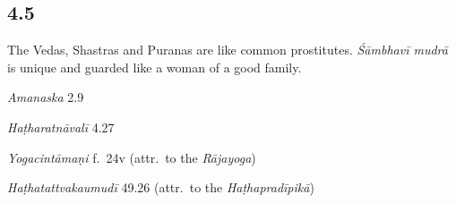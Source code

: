 \begin{ekdosis}

\subsection*{4.5}
\begin{translation}[hp04_005]
The Vedas, Shastras and Puranas are like common prostitutes. \emph{Śāmbhavī mudrā} is unique and guarded like a woman of a good family.
\end{translation}

\begin{sources}[hp04_005]
\emph{Amanaska} 2.9
\begin{versinnote}
\end{versinnote}
\end{sources}

\begin{testimonia}[hp04_005]
\emph{Haṭharatnāvalī} 4.27
\begin{versinnote}
\end{versinnote}

\emph{Yogacintāmaṇi} f.~24v (attr.~to the \textit{Rājayoga})
\begin{versinnote}
\end{versinnote}

\emph{Haṭhatattvakaumudī} 49.26 (attr.~to the \emph{Haṭhapradīpikā})
\begin{versinnote}
\end{versinnote}


\end{testimonia}
\end{ekdosis}
